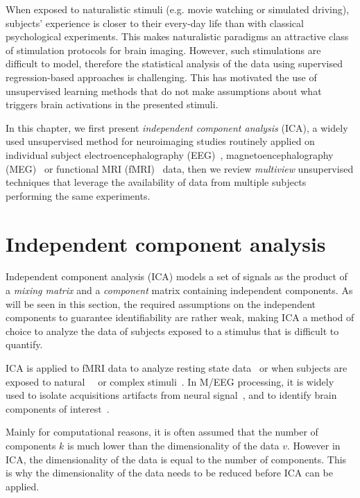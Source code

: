 When exposed to naturalistic stimuli (e.g. movie watching or simulated driving), subjects' experience is closer to their every-day life than with classical
psychological experiments.
% 
This makes naturalistic paradigms an attractive class of
stimulation protocols for brain imaging.
%
However, such stimulations are difficult to model, therefore the statistical analysis of the data using supervised regression-based approaches is challenging.
This has motivated the use of unsupervised learning methods that do not make
assumptions about what triggers brain activations in the presented stimuli.

In this chapter, we first present \emph{independent component analysis} (ICA), a widely used
unsupervised method for neuroimaging studies routinely applied on individual
subject electroencephalography (EEG)~\cite{makeig1996independent},
magnetoencephalography (MEG)~\cite{vigario1998independent} or functional MRI
(fMRI)~\cite{mckeown1998independent} data, then we review \emph{multiview} unsupervised 
techniques that leverage the availability of data from multiple subjects
performing the same experiments. 

\section{Independent component analysis}
\label{sec:ica}
Independent component analysis (ICA) models a set of signals as the product of a \emph{mixing matrix} and a
\emph{component} matrix containing independent components. As will be seen in this
section, the required assumptions on the independent components to guarantee
identifiability are rather weak, making ICA a method of choice to analyze the
data of subjects exposed to a stimulus that is difficult to quantify.

ICA is applied to fMRI data to analyze resting state
data~\cite{beckmann2005investigations} or when subjects are
exposed to natural~\cite{malinen2007towards}~\cite{bartels2005brain} or complex stimuli~\cite{calhoun2002different}. 
In M/EEG processing, it is widely used to isolate acquisitions artifacts from neural signal~\cite{jung1998extended}, and to identify brain components of interest~\cite{vigario2000independent, delorme2012independent}.

Mainly for computational reasons, it is often assumed that the number of components
$k$ is much lower than the dimensionality of the data $v$.
However in ICA, the dimensionality of the data is equal to the
number of components.
This is why the dimensionality of the data needs to be reduced before ICA can be applied.

